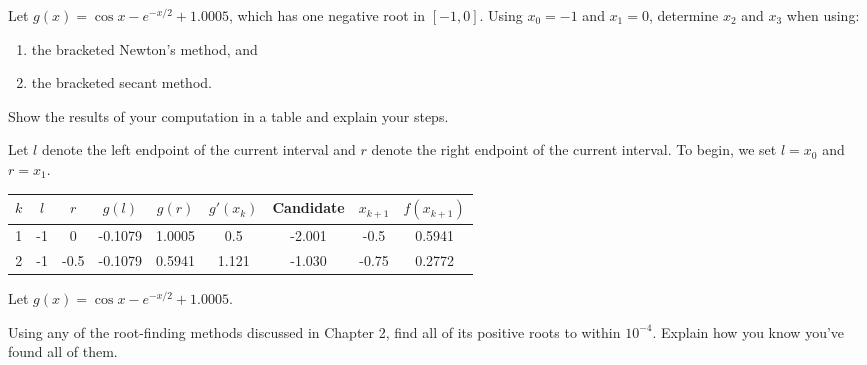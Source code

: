 \documentclass{eh-homework}
\begin{document}
    \newpage
    \begin{question}{4}
    Let \(g(x) = \cos x - e^{-x/2} + 1.0005\), which has one negative root in \([-1, 0]\). Using \(x_0 = -1\) and \(x_1 = 0\), determine \(x_2\) and \(x_3\) when using:
    
    \begin{enumerate}[label=\alph*.]
        \item the bracketed Newton’s method, and
        \item the bracketed secant method.
    \end{enumerate}
    
    Show the results of your computation in a table and explain your steps.

    Let \(l\) denote the left endpoint of the current interval and \(r\) denote the right endpoint of the current interval. To begin, we set \(l = x_0\) and \(r = x_1\).

    \begin{tabular}{c|c|c|c|c|c|c|c|c}
        \(k\) & \(l\) & \(r\) & \(g(l)\) & \(g(r)\) & \(g'(x_{k})\) & Candidate & \(x_{k+1}\) & \(f(x_{k+1})\) \\
        \hline
        1 & -1 & 0 & -0.1079 & 1.0005 & 0.5 & -2.001 & -0.5 & 0.5941 \\
        2 & -1 & -0.5 & -0.1079 & 0.5941 & 1.121 & -1.030 & -0.75 & 0.2772
    \end{tabular}
    \end{question}
    
    \begin{question}{5}
    Let \(g(x) = \cos x - e^{-x/2} + 1.0005\).
    
    Using any of the root-finding methods discussed in Chapter 2, find all of its positive roots to within \(10^{-4}\). Explain how you know you’ve found all of them.
    \end{question}
    
\end{document}

